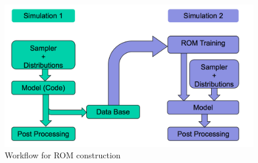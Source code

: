 \begin{figure}[h!]
  \centering
  \includegraphics[scale=0.7]{./pics/romConstruction.png}
  \caption{Workflow for ROM construction}
  \label{fig:romConstruction}
\end{figure}

\clearpage










